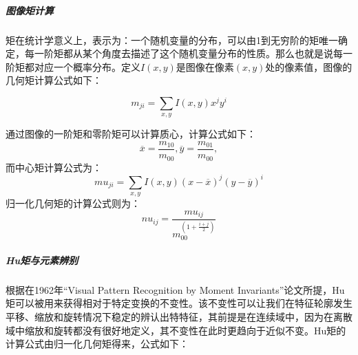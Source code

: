 \subparagraph{图像矩计算}
矩在统计学意义上，表示为：一个随机变量的分布，可以由1到无穷阶的矩唯一确定，每一阶矩都从某个角度去描述了这个随机变量分布的性质。那么也就是说每一阶矩都对应一个概率分布。定义$I(x,y)$是图像在像素$(x,y)$处的像素值，图像的几何矩计算公式如下：

\begin{equation}
    m_{ji} = \sum_{x,y}I(x,y)x^jy^i
\end{equation}

通过图像的一阶矩和零阶矩可以计算质心，计算公式如下：
\begin{equation}
    \overline{x} = \frac{m_{10}}{m_{00}},\overline{y} = \frac{m_{01}}{m_{00}},
\end{equation}
而中心矩计算公式为：
\begin{equation}
    mu_{ji} = \sum_{x,y}I(x,y)(x - \overline{x})^j(y - \overline{y})^i
\end{equation}
归一化几何矩的计算公式则为：
\begin{equation}
    nu_{ij} = \frac{mu_{ij}}{m_{00}^(1+\frac{i+j}{2})}
\end{equation}

\subparagraph{Hu矩与元素辨别}
根据在1962年“Visual Pattern Recognition by Moment Invariants”论文所提，Hu矩可以被用来获得相对于特定变换的不变性。该不变性可以让我们在特征轮廓发生平移、缩放和旋转情况下稳定的辨认出特特征，其前提是在连续域中，因为在离散域中缩放和旋转都没有很好地定义，其不变性在此时更趋向于近似不变。Hu矩的计算公式由归一化几何矩得来，公式如下：

